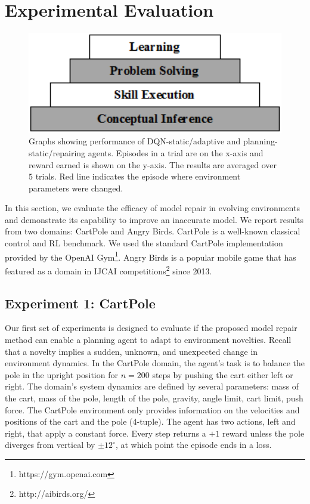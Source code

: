 \documentclass[letterpaper]{article} %
\begin{document}
\section{Experimental Evaluation}
\begin{figure}
    \centering
    \includegraphics[width=1\textwidth]{cascade.png}
    \caption{Graphs showing performance of DQN-static/adaptive and planning-static/repairing agents. Episodes in a trial are on the x-axis and reward earned is shown on the y-axis. The results are averaged over $5$ trials. Red line indicates the episode where environment parameters were changed.}
    \label{fig:combined_results}
\end{figure}
In this section, we evaluate the efficacy of model repair in evolving environments and demonstrate its capability to improve an inaccurate model. We report results from two domains: CartPole and Angry Birds. CartPole is a well-known classical control and RL benchmark. We used the standard CartPole implementation provided by the OpenAI Gym\footnote{https://gym.openai.com}. Angry Birds is a popular mobile game that has featured as a domain in IJCAI competitions\footnote{http://aibirds.org/} since 2013.

\subsection{Experiment 1: CartPole}
Our first set of experiments is designed to evaluate if the proposed model repair method can enable a planning agent to adapt to environment novelties. Recall that a novelty implies a sudden, unknown, and unexpected change in environment dynamics. In the CartPole domain, the agent's task is to balance the pole in the upright position for $n=200$ steps by pushing the cart either left or right. The domain's system dynamics are defined by several parameters: mass of the cart, mass of the pole, length of the pole, gravity, angle limit, cart limit, push force. The CartPole environment only provides information on the velocities and positions of the cart and the pole (4-tuple). The agent has two actions, left and right, that apply a constant force. Every step returns a $+1$ reward unless the pole diverges from vertical by $\pm 12^{\circ}$, at which point the episode ends in a loss.
\end{document}
